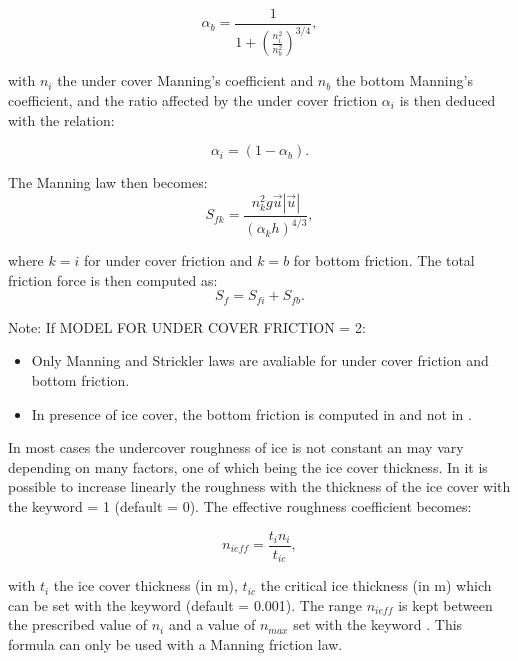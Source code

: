 \begin{enumerate}
\begin{equation}
  \alpha_b = \dfrac{1}{1+\left(\frac{n_i^2}{n_b^2}\right)^{3/4}},
\end{equation}

with $n_i$ the under cover Manning's coefficient and $n_b$ the bottom Manning's coefficient, and the ratio affected by the under cover friction $\alpha_i$ is then deduced with the relation:

\begin{equation}
  \alpha_i=(1-\alpha_b).
\end{equation}

The Manning law then becomes:
\begin{equation}
  S_{fk}=\dfrac{n_k^2g\vec{u}|\vec{u}|}{(\alpha_k h)^{4/3}},
\end{equation}

where $k=i$ for under cover friction and $k=b$ for bottom friction. The total friction force is then computed as:
\begin{equation}
S_f=S_{fi}+S_{fb}.
\end{equation} 

\begin{WarningBlock}{Note:}
  If MODEL FOR UNDER COVER FRICTION = 2:
\begin{itemize}
    \item Only Manning and Strickler laws are avaliable for under cover friction and bottom friction.
    \item In presence of ice cover, the bottom friction is computed in \khione and not in .
\end{itemize}
\end{WarningBlock}

\end{enumerate}

In most cases the undercover roughness of ice is not constant an may vary depending on many factors, one of which being the ice cover thickness.
In \khione it is possible to increase linearly the roughness with the thickness of the ice cover with the keyword  = 1 (default = 0). The effective roughness coefficient becomes:

\begin{equation}
 n_{ieff}=\frac{t_i n_i}{t_{ic}},
\end{equation}

with $t_i$ the ice cover thickness (in m), $t_{ic}$ the critical ice thickness (in m) which can be set with the keyword  (default = 0.001). The range $n_{ieff}$ is kept between the prescribed value of $n_i$ and a value of $n_{max}$ set with the keyword . This formula can only be used with a Manning friction law.


